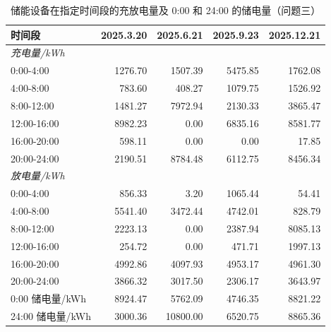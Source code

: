 \begin{table}[H]
\centering
{}
\begin{tabular}{lrrrr}
\toprule
时间段 & 2025.3.20 & 2025.6.21 & 2025.9.23 & 2025.12.21 \\
\midrule
\multicolumn{5}{l}{\textit{充电量/kWh}} \\
0:00-4:00 & 1276.70 & 1507.39 & 5475.85 & 1762.08 \\
4:00-8:00 & 783.60 & 408.27 & 1079.75 & 1526.92 \\
8:00-12:00 & 1481.27 & 7972.94 & 2130.33 & 3865.47 \\
12:00-16:00 & 8982.23 & 0.00 & 6835.16 & 8581.77 \\
16:00-20:00 & 598.11 & 0.00 & 0.00 & 17.85 \\
20:00-24:00 & 2190.51 & 8784.48 & 6112.75 & 8456.34 \\
\midrule
\multicolumn{5}{l}{\textit{放电量/kWh}} \\
0:00-4:00 & 856.33 & 3.20 & 1065.44 & 54.41 \\
4:00-8:00 & 5541.40 & 3472.44 & 4742.01 & 828.79 \\
8:00-12:00 & 2223.13 & 0.00 & 2387.94 & 8085.13 \\
12:00-16:00 & 254.72 & 0.00 & 471.71 & 1997.13 \\
16:00-20:00 & 4992.86 & 4097.93 & 4953.17 & 4961.30 \\
20:00-24:00 & 3866.32 & 3017.50 & 2306.17 & 3643.97 \\
\midrule
0:00 储电量/kWh & 8924.47 & 5762.09 & 4746.35 & 8821.22 \\
24:00 储电量/kWh & 3000.36 & 10800.00 & 6520.75 & 8865.36 \\
\bottomrule
\end{tabular}
\caption{储能设备在指定时间段的充放电量及 0:00 和 24:00 的储电量（问题三）}
\label{tab:m2-q3}
\end{table}
\par{}
